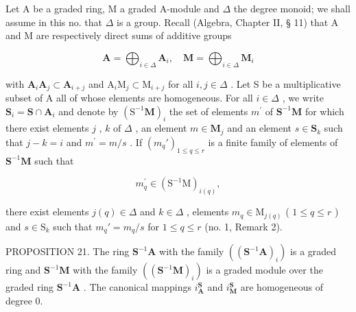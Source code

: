Let A be a graded ring, M a graded A-module and \(\Delta\) the degree monoid; we shall assume in this no. that \(\Delta\) is a group. Recall (Algebra, Chapter II, § 11) that A and M are respectively direct sums of additive groups

\[
\mathbf {A} = \bigoplus_ {i \in \Delta} \mathbf {A} _ {i}, \quad \mathbf {M} = \bigoplus_ {i \in \Delta} \mathbf {M} _ {i}
\]

with \(\mathbf{A}_i\mathbf{A}_j\subset \mathbf{A}_{i + j}\) and \(\mathrm{A}_i\mathrm{M}_j\subset \mathrm{M}_{i + j}\) for all \(i,j\in \Delta\) . Let S be a multiplicative subset of A all of whose elements are homogeneous. For all \(i\in \Delta\) , we write \(\mathbf{S}_i = \mathbf{S}\cap \mathbf{A}_i\) and denote by \((\mathrm{S}^{-1}\mathbf{M})_i\) the set of elements \(m^{\prime}\) of \(\mathbf{S}^{-1}\mathbf{M}\) for which there exist elements \(j\) , \(k\) of \(\Delta\) , an element \(m\in \mathbf{M}_j\) and an element \(s\in \mathbf{S}_k\) such that \(j - k = i\) and \(m^{\prime} = m / s\) . If \((m_q')_{1\leqslant q\leqslant r}\) is a finite family of elements of \(\mathbf{S}^{-1}\mathbf{M}\) such that

\[
m _ {q} ^ {\prime} \in (\mathrm{S} ^ {- 1} \mathrm{M}) _ {i (q)},
\]

there exist elements \(j(q) \in \Delta\) and \(k \in \Delta\) , elements \(m_q \in \mathrm{M}_{j(q)}\) ( \(1 \leqslant q \leqslant r\) ) and \(s \in \mathrm{S}_k\) such that \(m_q' = m_q / s\) for \(1 \leqslant q \leqslant r\) (no. 1, Remark 2).

PROPOSITION 21. The ring \(\mathbf{S}^{-1}\mathbf{A}\) with the family \(((\mathbf{S}^{-1}\mathbf{A})_i)\) is a graded ring and \(\mathbf{S}^{-1}\mathbf{M}\) with the family \(((\mathbf{S}^{-1}\mathbf{M})_i)\) is a graded module over the graded ring \(\mathbf{S}^{-1}\mathbf{A}\) . The canonical mappings \(i_{\mathbf{A}}^{\mathbf{S}}\) and \(i_{\mathbf{M}}^{\mathbf{S}}\) are homogeneous of degree 0.


